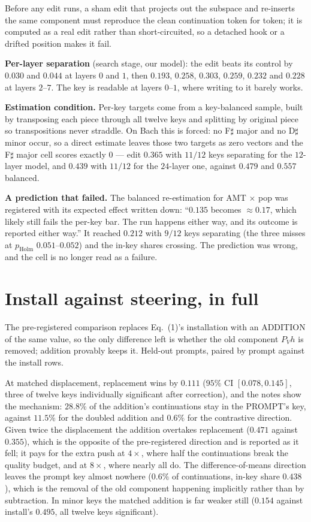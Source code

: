 \documentclass{article}
\begin{document}
Before any edit runs, a sham edit that projects out the subspace and re-inserts the
same component must reproduce the clean continuation token for token; it is computed
as a real edit rather than short-circuited, so a detached hook or a drifted position
makes it fail.

\textbf{Per-layer separation} (search stage, our model): the edit beats its control by
$0.030$ and $0.044$ at layers $0$ and $1$, then $0.193$, $0.258$, $0.303$, $0.259$,
$0.232$ and $0.228$ at layers $2$--$7$. The key is readable at layers $0$--$1$, where
writing to it barely works.

\textbf{Estimation condition.} Per-key targets come from a key-balanced sample, built
by transposing each piece through all twelve keys and splitting by original piece so
transpositions never straddle. On Bach this is forced: no F$\sharp$ major and no
D$\sharp$ minor occur, so a direct estimate leaves those two targets as zero vectors
and the F$\sharp$ major cell scores exactly $0$ --- edit $0.365$ with $11/12$ keys
separating for the $12$-layer model, and $0.439$ with $11/12$ for the $24$-layer one,
against $0.479$ and $0.557$ balanced.

\textbf{A prediction that failed.} The balanced re-estimation for AMT $\times$ pop was
registered with its expected effect written down: ``$0.135$ becomes $\approx0.17$,
which likely still fails the per-key bar. The run happens either way, and its outcome
is reported either way.'' It reached $0.212$ with $9/12$ keys separating (the three
misses at $p_{\text{Holm}}$ $0.051$--$0.052$) and the in-key shares crossing. The
prediction was wrong, and the cell is no longer read as a failure.

\section{Install against steering, in full}

The pre-registered comparison replaces Eq.~(1)'s installation with an ADDITION of the
same value, so the only difference left is whether the old component $P_Vh$ is removed;
addition provably keeps it. Held-out prompts, paired by prompt against the install rows.

At matched displacement, replacement wins by $0.111$ ($95\%$ CI $[0.078,0.145]$, three
of twelve keys individually significant after correction), and the notes show the
mechanism: $28.8\%$ of the addition's continuations stay in the PROMPT's key, against
$11.5\%$ for the doubled addition and $0.6\%$ for the contrastive direction. Given
twice the displacement the addition overtakes replacement ($0.471$ against $0.355$),
which is the opposite of the pre-registered direction and is reported as it fell; it
pays for the extra push at $4\times$, where half the continuations break the quality
budget, and at $8\times$, where nearly all do. The difference-of-means direction leaves
the prompt key almost nowhere ($0.6\%$ of continuations, in-key share $0.438$), which
is the removal of the old component happening implicitly rather than by subtraction. In
minor keys the matched addition is far weaker still ($0.154$ against install's $0.495$,
all twelve keys significant).
\end{document}
